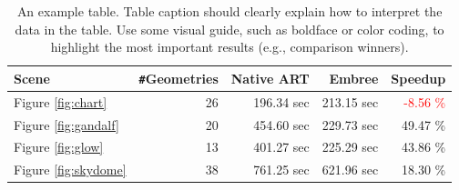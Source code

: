 \begin{table}
	\centering
	{\footnotesize\sf
		\begin{tabular}{lrrrr}
			\toprule
			Scene & \Verb!#!Geometries & Native ART & Embree & Speedup \\ 
			\midrule
			Figure \ref{fig:chart} & 26 & 196.34 sec & 213.15 sec & \textcolor{red}{-8.56 \%} \\
			Figure \ref{fig:gandalf} & 20 & 454.60 sec & 229.73 sec & 49.47 \% \\
			Figure \ref{fig:glow} & 13 & 401.27 sec & 225.29 sec & 43.86 \%  \\
			Figure \ref{fig:skydome} & 38 & 761.25 sec & 621.96 sec & 18.30 \% \\
			\bottomrule
	\end{tabular}}
	\caption{An example table. Table caption should clearly explain how to interpret the data in the table. Use some visual guide, such as boldface or color coding, to highlight the most important results (e.g., comparison winners).}
	\label{tab:scenes}
\end{table}



